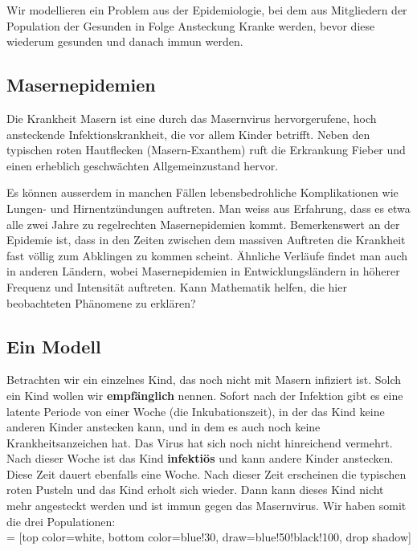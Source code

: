 \documentclass[%
<<<<<<< Updated upstream
11pt,%
twoside,%
titlepage,%
german,%
headsepline%
]{scrartcl}
\begin{document}
Wir modellieren ein Problem aus der Epidemiologie, bei dem aus Mitgliedern der Population der Gesunden in Folge Ansteckung Kranke werden, bevor diese wiederum gesunden und danach immun werden.

\subsection{Masernepidemien}
Die Krankheit Masern ist eine durch das Masernvirus hervorgerufene, hoch ansteckende Infektionskrankheit, die vor allem Kinder betrifft. Neben den typischen roten Hautflecken (Masern-Exanthem) ruft die Erkrankung Fieber und einen erheblich geschwächten Allgemeinzustand hervor.

Es können ausserdem in manchen Fällen lebensbedrohliche Komplikationen wie Lun\-gen- und Hirnentzündungen auftreten. Man weiss aus Erfahrung, dass es etwa alle zwei Jahre zu regelrechten Masernepidemien kommt. Bemerkenswert an der Epidemie ist, dass in den Zeiten zwischen dem massiven Auftreten die Krankheit fast völlig zum Abklingen zu kommen scheint. Ähnliche Verläufe findet man auch in anderen Ländern, wobei Masernepidemien in Entwicklungsländern in höherer Frequenz und Intensität auftreten. Kann Mathematik helfen, die hier beobachteten Phänomene zu erklären?

\subsection{Ein Modell}
Betrachten wir ein einzelnes Kind, das noch nicht mit Masern infiziert ist. Solch ein Kind wollen wir \textbf{empfänglich} nennen. Sofort nach der Infektion gibt es eine latente Periode von einer Woche (die Inkubationszeit), in der das Kind keine anderen Kinder anstecken kann, und in dem es auch noch keine Krankheitsanzeichen hat. Das Virus hat sich noch nicht hinreichend vermehrt. Nach dieser Woche ist das Kind \textbf{infektiös} und kann andere Kinder anstecken. Diese Zeit dauert ebenfalls eine Woche. Nach dieser Zeit erscheinen die typischen roten Pusteln und das Kind erholt sich wieder. Dann kann dieses Kind nicht mehr angesteckt werden und ist immun gegen das Masernvirus. Wir haben somit die drei Populationen:\\

 = [top color=white, bottom color=blue!30, 
                            draw=blue!50!black!100, drop shadow]
\end{document}
